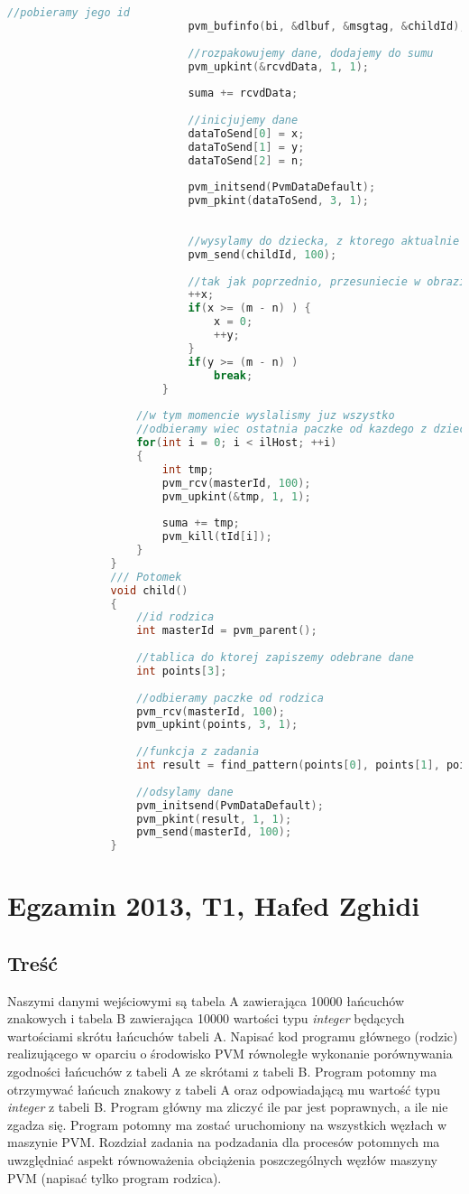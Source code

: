 \begin{lstlisting}[language=C]
							//pobieramy jego id
							pvm_bufinfo(bi, &dlbuf, &msgtag, &childId);
							
							//rozpakowujemy dane, dodajemy do sumu
							pvm_upkint(&rcvdData, 1, 1);
							
							suma += rcvdData;
							
							//inicjujemy dane
							dataToSend[0] = x;
							dataToSend[1] = y;
							dataToSend[2] = n;
							
							pvm_initsend(PvmDataDefault);
							pvm_pkint(dataToSend, 3, 1);
							
							
							//wysylamy do dziecka, z ktorego aktualnie odebrano rezultat
							pvm_send(childId, 100);
							
							//tak jak poprzednio, przesuniecie w obrazie
							++x;
							if(x >= (m - n) ) {
								x = 0;
								++y;
							}
							if(y >= (m - n) )
								break;
						}
					
					//w tym momencie wyslalismy juz wszystko
					//odbieramy wiec ostatnia paczke od kazdego z dzieci
					for(int i = 0; i < ilHost; ++i)
					{
						int tmp;
						pvm_rcv(masterId, 100);
						pvm_upkint(&tmp, 1, 1);
						
						suma += tmp;
						pvm_kill(tId[i]);
					}         
				}
				/// Potomek
				void child()
				{
					//id rodzica
					int masterId = pvm_parent();
					
					//tablica do ktorej zapiszemy odebrane dane
					int points[3];
					
					//odbieramy paczke od rodzica
					pvm_rcv(masterId, 100);
					pvm_upkint(points, 3, 1);
					
					//funkcja z zadania
					int result = find_pattern(points[0], points[1], points[2]);
					
					//odsylamy dane
					pvm_initsend(PvmDataDefault);
					pvm_pkint(result, 1, 1);
					pvm_send(masterId, 100);
				}
			\end{lstlisting}
	\newpage
	\section{Egzamin 2013, T1, Hafed Zghidi}
		\subsection{Treść}
			Naszymi danymi wejściowymi są tabela A zawierająca 10000 łańcuchów znakowych i tabela B zawierająca 10000 wartości typu \textit{integer} będących wartościami skrótu łańcuchów tabeli A. Napisać kod programu głównego (rodzic) realizującego w oparciu o środowisko PVM równoległe wykonanie porównywania zgodności łańcuchów z tabeli A ze skrótami z tabeli B. Program potomny ma otrzymywać łańcuch znakowy z tabeli A oraz odpowiadającą mu wartość typu \textit{integer} z tabeli B. Program główny ma zliczyć ile par jest poprawnych, a ile nie zgadza się. Program potomny ma zostać uruchomiony na wszystkich węzłach w maszynie PVM. Rozdział zadania na podzadania dla procesów potomnych ma uwzględniać aspekt równoważenia obciążenia poszczególnych węzłów maszyny PVM (napisać tylko program rodzica).
